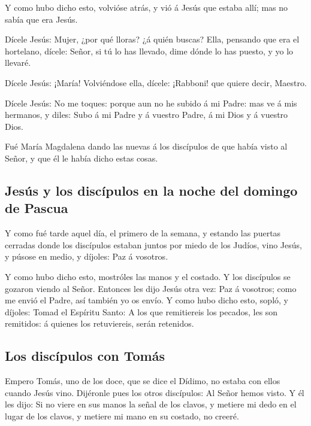  Y como hubo dicho esto, volvióse atrás, y vió á Jesús
que estaba allí; mas no sabía que era Jesús.

 Dícele Jesús: Mujer, ¿por qué lloras? ¿á quién buscas?
Ella, pensando que era el hortelano, dícele: Señor, si tú lo has
llevado, dime dónde lo has puesto, y yo lo llevaré.

 Dícele Jesús: ¡María! Volviéndose ella, dícele:
¡Rabboni! que quiere decir, Maestro.

 Dícele Jesús: No me toques: porque aun no he subido á mi
Padre: mas ve á mis hermanos, y diles: Subo á mi Padre y á vuestro
Padre, á mi Dios y á vuestro Dios.

 Fué María Magdalena dando las nuevas á los discípulos de
que había visto al Señor, y que él le había dicho estas cosas.

\hypertarget{jesuxfas-y-los-discuxedpulos-en-la-noche-del-domingo-de-pascua}{%
\subsection{Jesús y los discípulos en la noche del domingo de
Pascua}\label{jesuxfas-y-los-discuxedpulos-en-la-noche-del-domingo-de-pascua}}

 Y como fué tarde aquel día, el primero de la semana, y
estando las puertas cerradas donde los discípulos estaban juntos por
miedo de los Judíos, vino Jesús, y púsose en medio, y díjoles: Paz á
vosotros.

 Y como hubo dicho esto, mostróles las manos y el
costado. Y los discípulos se gozaron viendo al Señor. 
Entonces les dijo Jesús otra vez: Paz á vosotros; como me envió el
Padre, así también yo os envío.  Y como hubo dicho esto,
sopló, y díjoles: Tomad el Espíritu Santo:  A los que
remitiereis los pecados, les son remitidos: á quienes los retuviereis,
serán retenidos.

\hypertarget{los-discuxedpulos-con-tomuxe1s}{%
\subsection{Los discípulos con
Tomás}\label{los-discuxedpulos-con-tomuxe1s}}

 Empero Tomás, uno de los doce, que se dice el Dídimo, no
estaba con ellos cuando Jesús vino.  Dijéronle pues los
otros discípulos: Al Señor hemos visto. Y él les dijo: Si no viere en
sus manos la señal de los clavos, y metiere mi dedo en el lugar de los
clavos, y metiere mi mano en su costado, no creeré.


